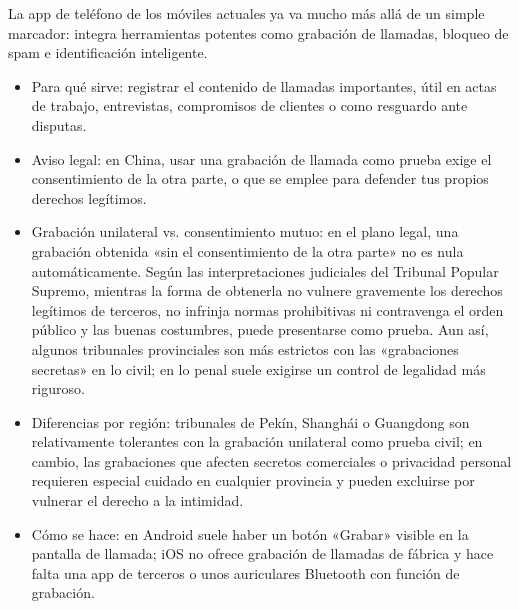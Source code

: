 


La app de teléfono de los móviles actuales ya va mucho más allá de un simple marcador: integra herramientas potentes como grabación de llamadas, bloqueo de spam e identificación inteligente.


\begin{itemize}
  \item Para qué sirve: registrar el contenido de llamadas importantes, útil en actas de trabajo, entrevistas, compromisos de clientes o como resguardo ante disputas.
  \item Aviso legal: en China, usar una grabación de llamada como prueba exige el consentimiento de la otra parte, o que se emplee para defender tus propios derechos legítimos.
  \item Grabación unilateral vs. consentimiento mutuo: en el plano legal, una grabación obtenida «sin el consentimiento de la otra parte» no es nula automáticamente. Según las interpretaciones judiciales del Tribunal Popular Supremo, mientras la forma de obtenerla no vulnere gravemente los derechos legítimos de terceros, no infrinja normas prohibitivas ni contravenga el orden público y las buenas costumbres, puede presentarse como prueba. Aun así, algunos tribunales provinciales son más estrictos con las «grabaciones secretas» en lo civil; en lo penal suele exigirse un control de legalidad más riguroso.
  \item Diferencias por región: tribunales de Pekín, Shanghái o Guangdong son relativamente tolerantes con la grabación unilateral como prueba civil; en cambio, las grabaciones que afecten secretos comerciales o privacidad personal requieren especial cuidado en cualquier provincia y pueden excluirse por vulnerar el derecho a la intimidad.
  \item Cómo se hace: en Android suele haber un botón «Grabar» visible en la pantalla de llamada; iOS no ofrece grabación de llamadas de fábrica y hace falta una app de terceros o unos auriculares Bluetooth con función de grabación.
\end{itemize}

